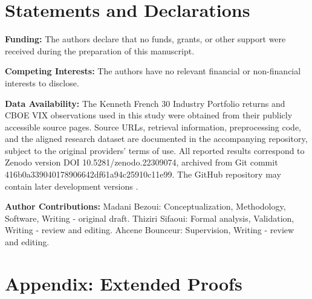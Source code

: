 \documentclass[smallextended]{svjour3}
\begin{document}
\newpage

\appendix


\section*{Statements and Declarations}

\textbf{Funding:} The authors declare that no funds, grants, or other support were received during the preparation of this manuscript.

\textbf{Competing Interests:} The authors have no relevant financial or non-financial interests to disclose.

\textbf{Data Availability:} The Kenneth French 30 Industry Portfolio returns \cite{french2026data} and CBOE VIX observations \cite{cboe2026vix} used in this study were obtained from their publicly accessible source pages. Source URLs, retrieval information, preprocessing code, and the aligned research dataset are documented in the accompanying repository, subject to the original providers' terms of use. All reported results correspond to Zenodo version DOI 10.5281/zenodo.22309074, archived from Git commit 416b0a339040178906642df61a94c25910c11e99. The GitHub repository may contain later development versions \cite{bezoui2026robust}.

\textbf{Author Contributions:} Madani Bezoui: Conceptualization, Methodology, Software, Writing - original draft. Thiziri Sifaoui: Formal analysis, Validation, Writing - review and editing. Ahcene Bounceur: Supervision, Writing - review and editing.




\section*{Appendix: Extended Proofs}\label{app:proofs}
\end{document}
